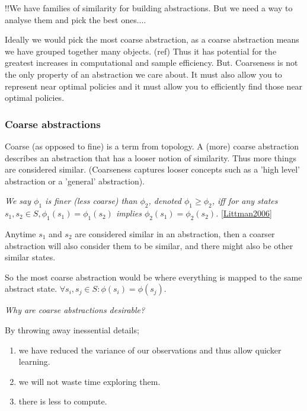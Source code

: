 !!We have families of similarity for building abstractions. But we need a way to analyse them and pick the best ones....

Ideally we would pick the most coarse abstraction, as a coarse abstraction means we have grouped together many objects. (ref)
Thus it has potential for the greatest increases in computational and sample efficiency.
But. Coarseness is not the only property of an abstraction we care about.
It must also allow you to represent near optimal policies and it must allow you
to efficiently find those near optimal policies.


\subsubsection{Coarse abstractions}

Coarse (as opposed to fine) is a term from topology.
A (more) coarse abstraction describes an abstraction that has a looser notion of similarity.
Thus more things are considered similar.
(Coarseness captures looser concepts such as a 'high level' abstraction or a 'general' abstraction).

\textit{We say $\phi_1$ is finer (less coarse) than $\phi_2$, denoted $\phi_1 \ge \phi_2$,
iff for any states $s_1, s_2 \in S, \phi_1(s_1) = \phi_1(s_2)$ implies $\phi_2(s_1) = \phi_2(s_2)$.} \ref{Littman2006}

Anytime $s_1$ and $s_2$ are considered similar in an abstraction, then a coarser
abstraction will also consider them to be similar, and there might also be other similar states.

So the most coarse abstraction would be where everything is mapped to the same abstract state.
$\forall s_i, s_j\in S: \phi(s_i)=\phi(s_j)$.


\begin{displayquote}
\textit{Why are coarse abstractions desirable?}
\end{displayquote}

By throwing away inessential details;
\begin{enumerate}
  \tightlist
  \item we have reduced the variance of our observations and thus allow quicker learning.
  \item we will not waste time exploring them.
  \item there is less to compute.
\end{enumerate}


